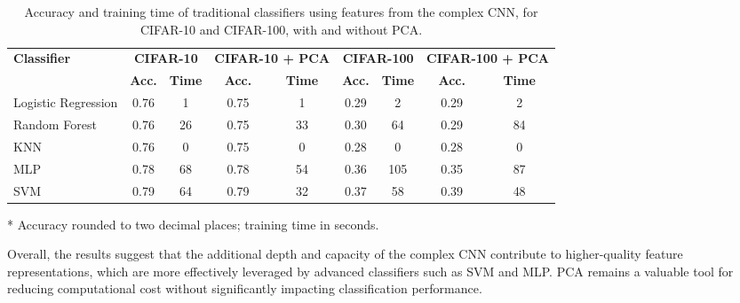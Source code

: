 \documentclass[journal,article,submit,pdftex,moreauthors]{Definitions/mdpi}
\begin{document}
\begin{table}[H]
\caption{Accuracy and training time of traditional classifiers using features from the complex CNN, for CIFAR-10 and CIFAR-100, with and without PCA.\label{tab:classifiers_results_complex}}
\centering
\begin{tabular}{lcccccccc}
\toprule
\multirow{2}{*}{\textbf{Classifier}} & \multicolumn{2}{c}{\textbf{CIFAR-10}} & \multicolumn{2}{c}{\textbf{CIFAR-10 + PCA}} & \multicolumn{2}{c}{\textbf{CIFAR-100}} & \multicolumn{2}{c}{\textbf{CIFAR-100 + PCA}} \\
\cmidrule(lr){2-3} \cmidrule(lr){4-5} \cmidrule(lr){6-7} \cmidrule(lr){8-9}
 & \textbf{Acc.} & \textbf{Time} & \textbf{Acc.} & \textbf{Time} & \textbf{Acc.} & \textbf{Time} & \textbf{Acc.} & \textbf{Time} \\
\midrule
Logistic Regression & 0.76 & 1 & 0.75 & 1 & 0.29 & 2 & 0.29 & 2 \\
Random Forest       & 0.76 & 26 & 0.75 & 33 & 0.30 & 64 & 0.29 & 84 \\
KNN                 & 0.76 & 0 & 0.75 & 0 & 0.28 & 0 & 0.28 & 0 \\
MLP                 & 0.78 & 68 & 0.78 & 54 & 0.36 & 105 & 0.35 & 87 \\
SVM                 & 0.79 & 64 & 0.79 & 32 & 0.37 & 58 & 0.39 & 48 \\
\bottomrule
\end{tabular}
\vspace{0.5em}

\noindent\footnotesize{* Accuracy rounded to two decimal places; training time in seconds.}
\end{table}

Overall, the results suggest that the additional depth and capacity of the complex CNN contribute to higher-quality feature representations, which are more effectively leveraged by advanced classifiers such as SVM and MLP. PCA remains a valuable tool for reducing computational cost without significantly impacting classification performance.
\end{document}
